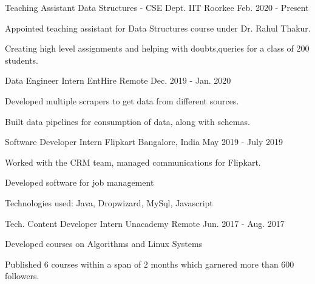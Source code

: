 

\begin{cventries}

  \cventry
    {Teaching Assistant} %
    {Data Structures - CSE Dept.} %
    {IIT Roorkee} %
    {Feb. 2020 - Present} %
    {
      \begin{cvitems} %
        \item {Appointed teaching assistant for Data Structures course under Dr. Rahul Thakur. }
    \item {Creating high level assignments and helping with doubts,queries for a class of 200 students. }
      \end{cvitems}
    }


  \cventry
    {Data Engineer Intern} %
    {EntHire} %
    {Remote} %
    {Dec. 2019 - Jan. 2020} %
    {
      \begin{cvitems} %
        \item {Developed multiple scrapers to get data from different sources.}
    \item {Built data pipelines for consumption of data, along with schemas.}
      \end{cvitems}
    }

  \cventry
    {Software Developer Intern} %
    {Flipkart} %
    {Bangalore, India} %
    {May 2019 - July 2019} %
    {
      \begin{cvitems} %
     \item Worked with the CRM team, managed communications for Flipkart.
    \item Developed software for job management
    \item Technologies used: Java, Dropwizard, MySql, Javascript
      \end{cvitems}
    }

  \cventry
    {Tech. Content Developer Intern } %
    {Unacademy} %
    {Remote} %
    {Jun. 2017 - Aug. 2017} %
    {
      \begin{cvitems} %
        \item {Developed courses on Algorithms and Linux Systems}
        \item {Published 6 courses within a span of 2 months which garnered more than 600 followers.}
      \end{cvitems}
    }

\end{cventries}
